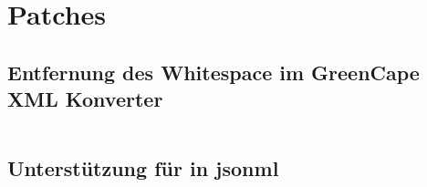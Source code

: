 \chapter{Patches}
\label{appx:patches}

\section{Entfernung des Whitespace im GreenCape XML Konverter}
\label{appx:greencapexml}

\inputminted[breakautoindent=false]{udiff}{patches/greencapexml-noindent.patch}

\section{Unterstützung für  in \acrshort{jsonml}}
\label{appx:jsonmlpi}

\inputminted[breakautoindent=false]{udiff}{patches/jsonml-pi.patch}
